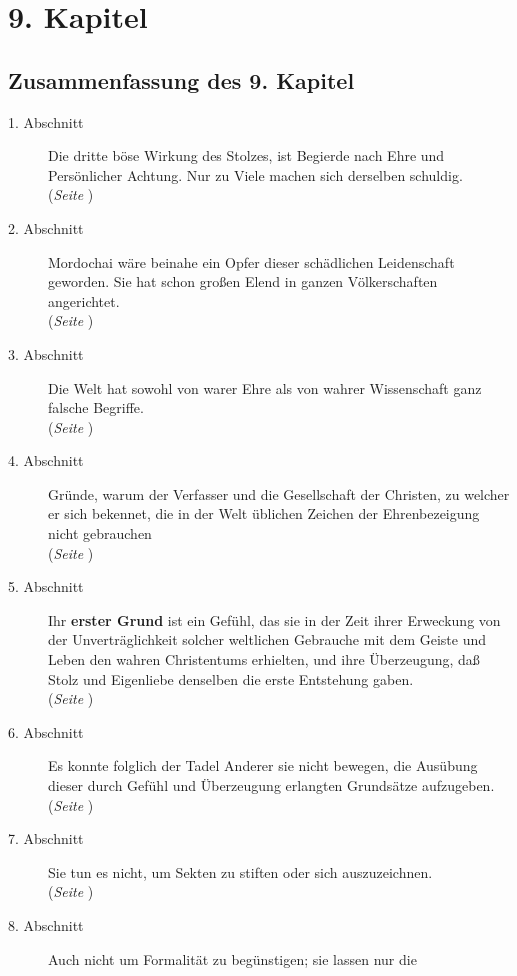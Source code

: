 
\chapter{9. Kapitel} \label{kap9}


\section{Zusammenfassung des 9. Kapitel}
\footnotesize
\begin{description}
\item[1. Abschnitt] Die dritte böse Wirkung des Stolzes, ist Begierde nach Ehre
und Persönlicher Achtung. Nur zu Viele machen sich derselben schuldig.
\\ (\textit{Seite \pageref{kap9_ab1}})
\item[2. Abschnitt] Mordochai wäre beinahe ein Opfer dieser schädlichen
Leidenschaft geworden. Sie hat schon großen Elend in ganzen Völkerschaften
angerichtet.
\\ (\textit{Seite \pageref{kap9_ab2}})
\item[3. Abschnitt] Die Welt hat sowohl von warer Ehre als von wahrer
Wissenschaft ganz falsche Begriffe.
\\ (\textit{Seite \pageref{kap9_ab3}})
\item[4. Abschnitt] Gründe, warum der Verfasser und die Gesellschaft der
Christen, zu welcher er sich bekennet, die in der Welt üblichen Zeichen der
Ehrenbezeigung nicht gebrauchen
\\ (\textit{Seite \pageref{kap9_ab4}})
\item[5. Abschnitt] Ihr \textbf{erster Grund} ist ein Gefühl, das sie in der
Zeit ihrer
Erweckung von der Unverträglichkeit solcher weltlichen Gebrauche mit dem Geiste
und Leben den wahren Christentums erhielten, und ihre Überzeugung, daß Stolz
und Eigenliebe denselben die erste Entstehung gaben.
\\ (\textit{Seite \pageref{kap9_ab5}})
\item[6. Abschnitt] Es konnte folglich der Tadel Anderer sie nicht bewegen, die
Ausübung dieser durch Gefühl und Überzeugung erlangten Grundsätze aufzugeben.
\\ (\textit{Seite \pageref{kap9_ab6}})
\item[7. Abschnitt] Sie tun es nicht, um Sekten zu stiften oder sich
auszuzeichnen.
\\ (\textit{Seite \pageref{kap9_ab7}})
\item[8. Abschnitt] Auch nicht um Formalität zu begünstigen; sie lassen nur die

\end{description}
